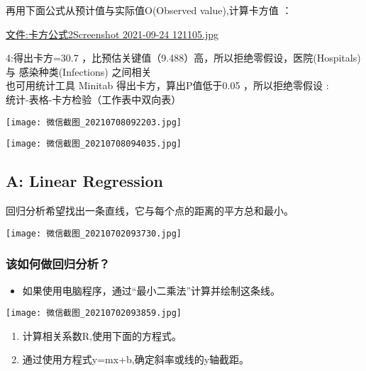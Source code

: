 
再用下面公式从预计值与实际值O(Observed value),计算卡方值 ：

\href{文件:卡方公式2Screenshot_2021-09-24_121105.jpg}{文件:卡方公式2Screenshot
2021-09-24 121105.jpg}



4:得出卡方=30.7
，比预估关键值（9.488）高，所以拒绝零假设，医院(Hospitals) 与
感染种类(Infections) 之间相关\\
也可用统计工具 Minitab 得出卡方，算出P值低于0.05 ，所以拒绝零假设 :\\
统计-表格-卡方检验（工作表中双向表）


\texttt{[image: 微信截图\_20210708092203.jpg]}


\texttt{[image: 微信截图\_20210708094035.jpg]}

\hypertarget{a-linear-regression}{%
\subsection{A: Linear Regression}\label{a-linear-regression}}

回归分析希望找出一条直线，它与每个点的距离的平方总和最小。


\texttt{[image: 微信截图\_20210702093730.jpg]}

\hypertarget{ux8be5ux5982ux4f55ux505aux56deux5f52ux5206ux6790}{%
\subsubsection{该如何做回归分析？}\label{ux8be5ux5982ux4f55ux505aux56deux5f52ux5206ux6790}}

\begin{itemize}
\tightlist
\item
  如果使用电脑程序，通过``最小二乘法''计算并绘制这条线。
\end{itemize}


\texttt{[image: 微信截图\_20210702093859.jpg]}

\begin{enumerate}
\tightlist
\item
  计算相关系数R,使用下面的方程式。
\item
  通过使用方程式y=mx+b,确定斜率或线的y轴截距。
\end{enumerate}

